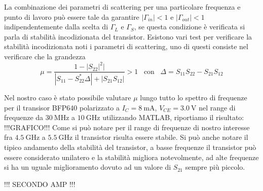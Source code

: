 \documentclass[12pt]{article}
\begin{document}
La combinazione dei parametri di scattering per una particolare frequenza e punto di lavoro può essere tale da garantire $\left|\Gamma_{in}\right| < 1$ e $\left|\Gamma_{out}\right| < 1$ indipendentemente dalla scelta di $\Gamma_{L}$ e $\Gamma_{S}$, se questa condizione è verificata si parla di stabilità incodizionata del transistor. Esistono vari test per verificare la stabilità incodizionata noti i parametri di scattering, uno di questi consiste nel verificare che la grandezza
\begin{equation}
    \mu = \dfrac{1-\left|S_{22}\right|^2|}{\left|S_{11}-S_{22}^{*}\Delta\right|+\left|S_{21}S_{12}\right|}> 1 \hspace{10pt} \text{con} \hspace{10pt} \Delta=S_{11}S_{22}-S_{21}S_{12}
\end{equation}

Nel nostro caso è stato possibile valutare $\mu$ lungo tutto lo spettro di frequenze per il transisor BFP640 polarizzato a $I_{C}=\SI{8}{\milli\ampere}$, $V_{CE}=\SI{3.0}{\volt}$ nel range di frequenze da $\SI{30}{\mega\hertz}$ a $\SI{10}{\giga\hertz}$ utilizzando MATLAB, riportiamo il risultato:
!!!GRAFICO!!!
Come si può notare per il range di frequenze di nostro interesse fra $\SI{4.5}{\giga\hertz}$ a $\SI{5.5}{\giga\hertz}$ il transistor risulta essere stabile. Si può anche notare il tipico andamento della stabilità del transistor, a basse frequenze il transistor può essere considerato unilatero e la stabilità migliora notevolmente, ad alte frequenze si ha un uguale miglioramento dovuto ad un valore di $S_{21}$ sempre più piccolo.

!!! SECONDO AMP !!!
\end{document}
